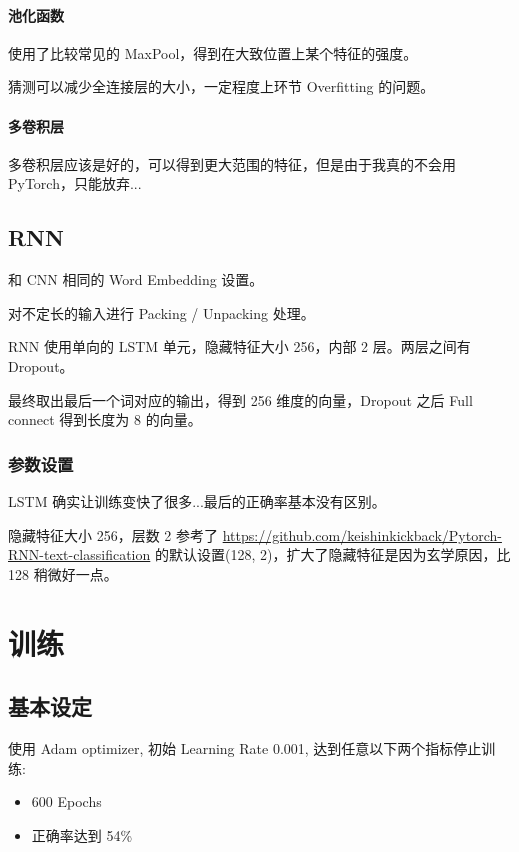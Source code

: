 \documentclass{ctexart}
\begin{document}
\paragraph{池化函数}
使用了比较常见的 MaxPool，得到在大致位置上某个特征的强度。

猜测可以减少全连接层的大小，一定程度上环节 Overfitting 的问题。

\paragraph{多卷积层}
多卷积层应该是好的，可以得到更大范围的特征，但是由于我真的不会用 PyTorch，只能放弃...

\subsection{RNN}
和 CNN 相同的 Word Embedding 设置。

对不定长的输入进行 Packing / Unpacking 处理。

RNN 使用单向的 LSTM 单元，隐藏特征大小 256，内部 2 层。两层之间有 Dropout。

最终取出最后一个词对应的输出，得到 256 维度的向量，Dropout 之后 Full connect 得到长度为 8 的向量。

\subsubsection{参数设置}
LSTM 确实让训练变快了很多...最后的正确率基本没有区别。

隐藏特征大小 256，层数 2 参考了 \url{https://github.com/keishinkickback/Pytorch-RNN-text-classification} 的默认设置(128, 2)，扩大了隐藏特征是因为玄学原因，比 128 稍微好一点。

\section{训练}

\subsection{基本设定}

使用 Adam optimizer, 初始 Learning Rate 0.001, 达到任意以下两个指标停止训练:

\begin{itemize}
\item 600 Epochs
\item 正确率达到 54\%
\end{itemize}
\end{document}
